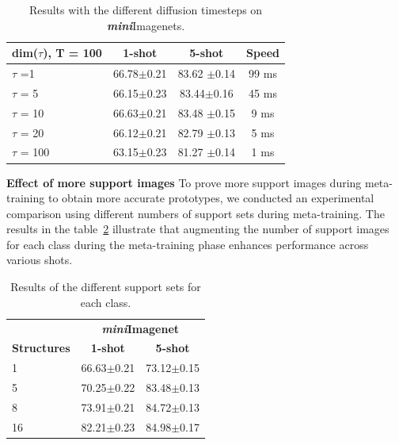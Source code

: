 \begin{table}[ht]
\caption{Results with the different diffusion timesteps on \textbf{\textit{mini}}Imagenets.}
\centering
\begin{tabular}{lccc}
\toprule 
dim($\tau$), T = 100 & \textbf{1-shot} & \textbf{5-shot}  & \textbf{Speed}   \\
\midrule 
$\tau$ =1  & 66.78\textcolor{mygray}{\scriptsize{$\pm$0.21}} & 83.62 \textcolor{mygray}{\scriptsize{$\pm$0.14}}  &  99 ms\\
$\tau$ = 5 & 66.15\textcolor{mygray}{\scriptsize{$\pm$0.23}} & 83.44\textcolor{mygray}{\scriptsize{$\pm$0.16}}  &  45 ms\\
$\tau$ = 10  & 66.63\textcolor{mygray}{\scriptsize{$\pm$0.21}} & 83.48 \textcolor{mygray}{\scriptsize{$\pm$0.15}}  &  9 ms\\
$\tau$ = 20  & 66.12\textcolor{mygray}{\scriptsize{$\pm$0.21}} & 82.79 \textcolor{mygray}{\scriptsize{$\pm$0.13}}  &  5 ms\\
$\tau$ = 100  & 63.15\textcolor{mygray}{\scriptsize{$\pm$0.23}} & 81.27 \textcolor{mygray}{\scriptsize{$\pm$0.14}}  &1 ms\\
\bottomrule
\end{tabular}
\label{tab:diff_tau}
\end{table}



\textbf{Effect of more support images}
To prove more support images during meta-training to obtain more accurate prototypes, we conducted an experimental comparison using different numbers of support sets during meta-training. The results in the table~\ref{tab:num_supports} illustrate that augmenting the number of support images for each class during the meta-training phase enhances performance across various shots. 



\begin{table}[ht]
\caption{Results of the different support sets for each class.}
\centering
\begin{tabular}{lcc}
\toprule 
 &  \multicolumn{2}{c}{\textbf{\textit{mini}Imagenet}}  \\
\textbf{Structures} & \textbf{1-shot} & \textbf{5-shot}   \\
\midrule 
1  & 66.63\textcolor{mygray}{\scriptsize{$\pm$0.21}} & 73.12\textcolor{mygray}{\scriptsize{$\pm$0.15}} \\
5 & 70.25\textcolor{mygray}{\scriptsize{$\pm$0.22}} & 83.48\textcolor{mygray}{\scriptsize{$\pm$0.13}}  \\
8 & 73.91\textcolor{mygray}{\scriptsize{$\pm$0.21}} & 84.72\textcolor{mygray}{\scriptsize{$\pm$0.13}}  \\
16 & 82.21\textcolor{mygray}{\scriptsize{$\pm$0.23}} & 84.98\textcolor{mygray}{\scriptsize{$\pm$0.17}}  \\
\bottomrule
\end{tabular}
\label{tab:num_supports}
\end{table}

